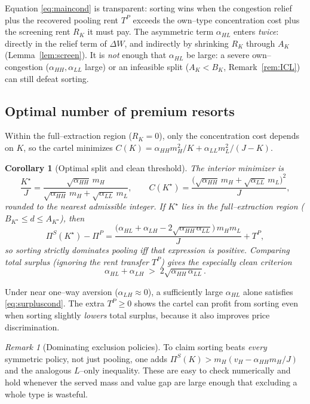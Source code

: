 \documentclass[11pt]{article}
\theoremstyle{plain}
\newtheorem{corollary}{Corollary}
\theoremstyle{definition}
\theoremstyle{remark}
\newtheorem{remark}{Remark}
\newcommand{\mH}{m_{H}}
\newcommand{\mL}{m_{L}}
\newcommand{\vH}{v_{H}}
\newcommand{\aHH}{\alpha_{HH}}
\newcommand{\aHL}{\alpha_{HL}}
\newcommand{\aLH}{\alpha_{LH}}
\newcommand{\aLL}{\alpha_{LL}}
\newcommand{\TP}{T^{P}}
\newcommand{\PiP}{\Pi^{P}}
\newcommand{\PiS}{\Pi^{S}}
\begin{document}
\noindent Equation \eqref{eq:maincond} is transparent: sorting wins when the congestion relief
plus the recovered pooling rent $\TP$ exceeds the own--type concentration cost plus the
screening rent $R_K$ it must pay. The asymmetric term $\aHL$ enters \emph{twice}: directly in
the relief term of $\Delta W$, and indirectly by shrinking $R_K$ through $A_K$
(Lemma~\ref{lem:screen}). It is \emph{not} enough that $\aHL$ be large: a severe own--congestion
($\aHH,\aLL$ large) or an infeasible split ($A_K<B_K$, Remark~\ref{rem:ICL}) can still defeat
sorting.

\subsection{Optimal number of premium resorts}

Within the full--extraction region ($R_K=0$), only the concentration cost depends on $K$, so the
cartel minimizes $C(K)=\aHH\mH^2/K+\aLL\mL^2/(J-K)$.

\begin{corollary}[Optimal split and clean threshold]\label{cor:split}
The interior minimizer is
\begin{equation}
\frac{K^\star}{J}=\frac{\sqrt{\aHH}\,\mH}{\sqrt{\aHH}\,\mH+\sqrt{\aLL}\,\mL},
\qquad
C(K^\star)=\frac{\big(\sqrt{\aHH}\,\mH+\sqrt{\aLL}\,\mL\big)^2}{J},
\end{equation}
rounded to the nearest admissible integer. If $K^\star$ lies in the full--extraction region
($B_{K^\star}\le d\le A_{K^\star}$), then
\begin{equation}
\boxed{\ \PiS(K^\star)-\PiP=\frac{\big(\aHL+\aLH-2\sqrt{\aHH\,\aLL}\big)\,\mH\mL}{J}+\TP, \ }
\end{equation}
so sorting strictly dominates pooling iff that expression is positive. Comparing total
\emph{surplus} (ignoring the rent transfer $\TP$) gives the especially clean criterion
\begin{equation}
\boxed{\ \aHL+\aLH \;>\; 2\sqrt{\aHH\,\aLL}. \ }
\label{eq:surpluscond}
\end{equation}
\end{corollary}

\noindent Under near one--way aversion ($\aLH\approx0$), a sufficiently large $\aHL$ alone
satisfies \eqref{eq:surpluscond}. The extra $\TP\ge0$ shows the cartel can profit from sorting
even when sorting slightly \emph{lowers} total surplus, because it also improves price
discrimination.

\begin{remark}[Dominating exclusion policies]\label{rem:exclusion}
To claim sorting beats \emph{every} symmetric policy, not just pooling, one adds
$\PiS(K)>\mH(\vH-\aHH\mH/J)$ and the analogous $L$--only inequality. These are easy to check
numerically and hold whenever the served mass and value gap are large enough that excluding a
whole type is wasteful.
\end{remark}
\end{document}
